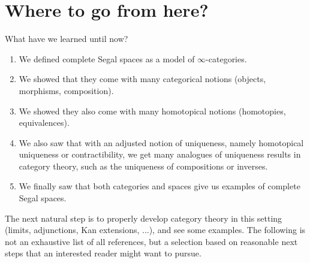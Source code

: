 \documentclass[11pt, a4paper]{amsart}
\theoremstyle{definition}
\theoremstyle{remark}
\numberwithin{equation}{section}
\begin{document}
\section{Where to go from here?} \label{sec:next}
What have we learned until now? 
\begin{enumerate}[leftmargin=*]
  \item We defined complete Segal spaces as a model of $\infty$-categories.
  \item We showed that they come with many categorical notions (objects, morphisms, composition).
  \item We showed they also come with many homotopical notions (homotopies, equivalences).
  \item We also saw that with an adjusted notion of uniqueness, namely homotopical uniqueness or contractibility, we get many analogues of uniqueness results in category theory, such as the uniqueness of compositions or inverses.
  \item We finally saw that both categories and spaces give us examples of complete Segal spaces.
\end{enumerate}

The next natural step is to properly develop category theory in this setting (limits, adjunctions, Kan extensions, ...), and see some examples. The following is not an exhaustive list of all references, but a selection based on reasonable next steps that an interested reader might want to pursue.
\end{document}
